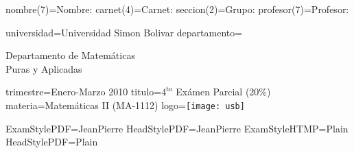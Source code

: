 nombre(7)=Nombre: 
carnet(4)=Carnet:
seccion(2)=Grupo:
profesor(7)=Profesor: 

universidad=Universidad Simon Bolivar
departamento=\begin{center}Departamento de Matem\'aticas\\Puras y Aplicadas\end{center}
trimestre=Enero-Marzo 2010
titulo=$4^{\mbox{to}}$ Ex\'amen Parcial (20\%)
materia=Matem\'aticas II (MA-1112)
logo=\texttt{[image: usb]}

ExamStylePDF=JeanPierre
HeadStylePDF=JeanPierre
ExamStyleHTMP=Plain
HeadStylePDF=Plain

\documentclass[12pt]{article}
\usepackage[utf8]{inputenc}                                                                               
\usepackage[spanish]{babel}    
\usepackage{amsmath,amstext,amscd,amsfonts,amssymb,amsthm}
\usepackage{epsfig}         
\newcommand{\re}{\mathbb R}                                                                               
\newcommand{\Ln}{\textrm{Ln}}                                                                             

\begin{Pregunta}{3}{1}                                                                                    
El valor del ${\displaystyle\int_{-\infty}^\infty\frac{{\rm d}x}{1+x^2}}$ es igual a:                  
\Opcion                                                                                                   
${\displaystyle\frac{\pi}{2}}$                                                                            
\Opcion                                                                                                   
${\displaystyle\pi}$                                                                                      
\Opcion                                                                                                   
No converge                                                                                               
\Opcion                                                                                                   
${\displaystyle-\frac{\pi}{4}}$                                                                           
\end{Pregunta}                                                                                            


